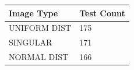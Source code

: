 \begin{table}[h!]
\centering
\begin{tabular}{ll}
\hline
\textbf{Image Type} & \textbf{Test Count} \\ 
\hline
UNIFORM DIST & 175 \\ 
SINGULAR & 171 \\ 
NORMAL DIST & 166 \\ 
\hline
\end{tabular}
\end{table}